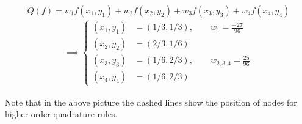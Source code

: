 \begin{equation*}
Q(f)= w_1f(x_1,y_1) + w_2f(x_2,y_2) + w_3f(x_3,y_3) + w_4f(x_4,y_4)
\end{equation*}
\begin{align*}\implies
\begin{cases}
(x_1,y_1)&= (1/3,1/3),  \qquad w_1= \frac{-27}{96}\\
(x_2,y_2)&= (2/3,1/6)  \\
(x_3,y_3)&= (1/6,2/3),  \qquad w_{2,3,4}= \frac{25}{96}\\
(x_4,y_4)&= (1/6,2/3)
\end{cases} 
\end{align*}

Note that in the above picture the dashed lines show the position of nodes for higher order quadrature rules.